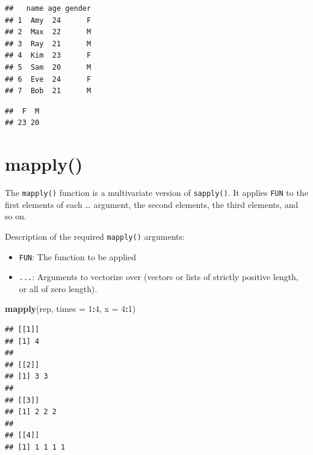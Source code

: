 \documentclass[
]{book}
\newenvironment{Shaded}{\begin{snugshade}}{\end{snugshade}}
\newcommand{\DataTypeTok}[1]{\textcolor[rgb]{0.13,0.29,0.53}{#1}}
\newcommand{\DecValTok}[1]{\textcolor[rgb]{0.00,0.00,0.81}{#1}}
\newcommand{\KeywordTok}[1]{\textcolor[rgb]{0.13,0.29,0.53}{\textbf{#1}}}
\newcommand{\NormalTok}[1]{#1}
\newcommand{\OperatorTok}[1]{\textcolor[rgb]{0.81,0.36,0.00}{\textbf{#1}}}
\providecommand{\tightlist}{%
  \setlength{\itemsep}{0pt}\setlength{\parskip}{0pt}}
\begin{document}
\begin{verbatim}
##   name age gender
## 1  Amy  24      F
## 2  Max  22      M
## 3  Ray  21      M
## 4  Kim  23      F
## 5  Sam  20      M
## 6  Eve  24      F
## 7  Bob  21      M
\end{verbatim}

\begin{Shaded}
\end{Shaded}

\begin{verbatim}
##  F  M 
## 23 20
\end{verbatim}

\hypertarget{mapply}{%
\section{mapply()}\label{mapply}}

The \texttt{mapply()} function is a multivariate version of \texttt{sapply()}. It applies \texttt{FUN} to the first elements of each \ldots{} argument, the second elements, the third elements, and so on.

Description of the required \texttt{mapply()} arguments:

\begin{itemize}
\tightlist
\item
  \texttt{FUN}: The function to be applied
\item
  \texttt{...}: Arguments to vectorize over (vectors or lists of strictly positive length, or all of zero length).
\end{itemize}

\begin{Shaded}
\begin{Highlighting}[]
\KeywordTok{mapply}\NormalTok{(rep, }\DataTypeTok{times =} \DecValTok{1}\OperatorTok{:}\DecValTok{4}\NormalTok{,}
    \DataTypeTok{x =} \DecValTok{4}\OperatorTok{:}\DecValTok{1}\NormalTok{)}
\end{Highlighting}
\end{Shaded}

\begin{verbatim}
## [[1]]
## [1] 4
## 
## [[2]]
## [1] 3 3
## 
## [[3]]
## [1] 2 2 2
## 
## [[4]]
## [1] 1 1 1 1
\end{verbatim}
\end{document}
